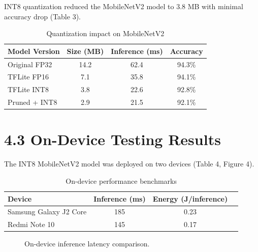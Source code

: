 \documentclass[12pt,letterpaper]{report}
\begin{document}
INT8 quantization reduced the MobileNetV2 model to 3.8 MB with minimal accuracy drop (Table 3).

\begin{table}[H]
\centering
\caption{Quantization impact on MobileNetV2}
\label{tab:quant}
\begin{tabular}{@{}lccc@{}}
\toprule
\textbf{Model Version} & \textbf{Size (MB)} & \textbf{Inference (ms)} & \textbf{Accuracy} \\
\midrule
Original FP32 & 14.2 & 62.4 & 94.3\% \\
TFLite FP16 & 7.1 & 35.8 & 94.1\% \\
TFLite INT8 & 3.8 & 22.6 & 92.8\% \\
Pruned + INT8 & 2.9 & 21.5 & 92.1\% \\
\bottomrule
\end{tabular}
\end{table}

\section*{4.3 On-Device Testing Results}

The INT8 MobileNetV2 model was deployed on two devices (Table 4, Figure 4).

\begin{table}[H]
\centering
\caption{On-device performance benchmarks}
\label{tab:ondevice}
\begin{tabular}{@{}lccc@{}}
\toprule
\textbf{Device} & \textbf{Inference (ms)} & \textbf{Energy (J/inference)} \\
\midrule
Samsung Galaxy J2 Core & 185 & 0.23 \\
Redmi Note 10 & 145 & 0.17 \\
\bottomrule
\end{tabular}
\end{table}

\begin{figure}[H]
\centering
{}
\caption{On-device inference latency comparison.}
\label{fig:inference}
\end{figure}
\end{document}
